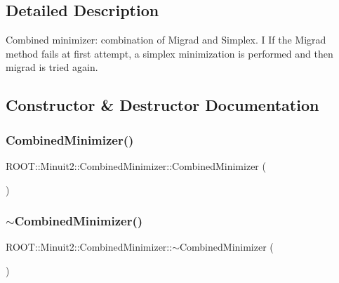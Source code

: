 \subsection{Detailed Description}
Combined minimizer\+: combination of Migrad and Simplex. I If the Migrad method fails at first attempt, a simplex minimization is performed and then migrad is tried again. 

\subsection{Constructor \& Destructor Documentation}
\mbox{\label{classROOT_1_1Minuit2_1_1CombinedMinimizer_a9e94be9d301a4db910252f4856c34801}} 
\subsubsection{\texorpdfstring{CombinedMinimizer()}{CombinedMinimizer()}\hspace{0.1cm}{\footnotesize\ttfamily [1/3]}}
{\footnotesize\ttfamily R\+O\+O\+T\+::\+Minuit2\+::\+Combined\+Minimizer\+::\+Combined\+Minimizer (\begin{DoxyParamCaption}{ }\end{DoxyParamCaption})\hspace{0.3cm}{\ttfamily [inline]}}

\mbox{\label{classROOT_1_1Minuit2_1_1CombinedMinimizer_a09de1afbff4418ffaf7b94e625243cd1}} 
\subsubsection{\texorpdfstring{$\sim$CombinedMinimizer()}{~CombinedMinimizer()}\hspace{0.1cm}{\footnotesize\ttfamily [1/3]}}
{\footnotesize\ttfamily R\+O\+O\+T\+::\+Minuit2\+::\+Combined\+Minimizer\+::$\sim$\+Combined\+Minimizer (\begin{DoxyParamCaption}{ }\end{DoxyParamCaption})\hspace{0.3cm}{\ttfamily [inline]}}

